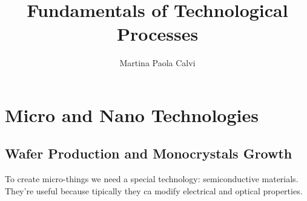 \documentclass{report}
\begin{document}
\sloppy %
\title{Fundamentals of Technological Processes}
\author{Martina Paola Calvi}
\maketitle
\tableofcontents

\part{Micro and Nano Technologies}
\chapter{Wafer Production and Monocrystals Growth}
To create micro-things we need a special technology: semiconductive materials. They're useful because tipically they ca modify electrical and optical properties.
\end{document}
